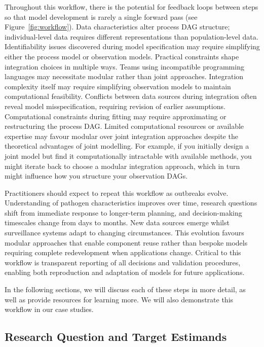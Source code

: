 \documentclass{article}
\begin{document}
Throughout this workflow, there is the potential for feedback loops between steps so that model development is rarely a single forward pass (see Figure~\ref{fig:workflow}). 
Data characteristics alter process DAG structure; individual-level data requires different representations than population-level data. 
Identifiability issues discovered during model specification may require simplifying either the process model or observation models. 
Practical constraints shape integration choices in multiple ways. Teams using incompatible programming languages may necessitate modular rather than joint approaches. 
Integration complexity itself may require simplifying observation models to maintain computational feasibility. Conflicts between data sources during integration often reveal model misspecification, requiring revision of earlier assumptions. 
Computational constraints during fitting may require approximating or restructuring the process DAG. Limited computational resources or available expertise may favour modular over joint integration approaches despite the theoretical advantages of joint modelling. 
For example, if you initially design a joint model but find it computationally intractable with available methods, you might iterate back to choose a modular integration approach, which in turn might influence how you structure your observation DAGs.

Practitioners should expect to repeat this workflow as outbreaks evolve.
Understanding of pathogen characteristics improves over time, research questions shift from immediate response to longer-term planning, and decision-making timescales change from days to months.
New data sources emerge whilst surveillance systems adapt to changing circumstances.
This evolution favours modular approaches that enable component reuse rather than bespoke models requiring complete redevelopment when applications change.
Critical to this workflow is transparent reporting of all decisions and validation procedures, enabling both reproduction and adaptation of models for future applications.

In the following sections, we will discuss each of these steps in more detail, as well as provide resources for learning more. We will also demonstrate this workflow in our case studies.

\subsection{Research Question and Target Estimands}
\end{document}
